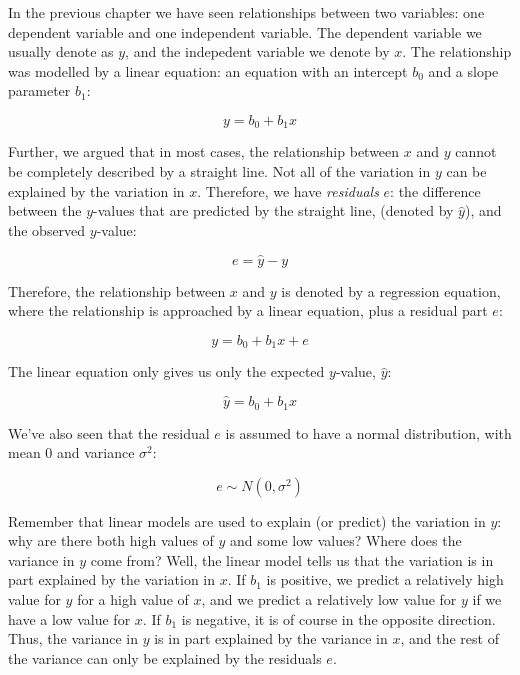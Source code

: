 \documentclass[]{book}\usepackage[]{graphicx}\usepackage[]{color}
\begin{document}
In the previous chapter we have seen relationships between two variables: one dependent variable and one independent variable. The dependent variable we usually denote as $y$, and the indepedent variable we denote by $x$. The relationship was modelled by a linear equation: an equation with an intercept $b_0$ and a slope parameter $b_1$:


\begin{equation}
y = b_0 + b_1 x
\end{equation}

Further, we argued that in most cases, the relationship between $x$ and $y$ cannot be completely described by a straight line. Not all of the variation in $y$ can be explained by the variation in $x$. Therefore, we have \textit{residuals} $e$: the difference between the $y$-values that are predicted by the straight line, (denoted by $\hat{y}$), and the observed $y$-value:

\begin{equation}
e = \hat{y} - y
\end{equation}

Therefore, the relationship between $x$ and $y$ is denoted by a regression equation, where the relationship is approached by a linear equation, plus a residual part $e$:

\begin{equation}
y = b_0 + b_1 x + e
\end{equation}

The linear equation only gives us only the expected $y$-value, $\hat{y}$:


\begin{equation}
\hat{y} = b_0 + b_1 x
\end{equation}


We've also seen that the residual $e$ is assumed to have a normal distribution, with mean 0 and variance $\sigma^2$:


\begin{equation}
e \sim N(0,\sigma^2)
\end{equation}

Remember that linear models are used to explain (or predict) the variation in $y$: why are there both high values of $y$ and some low values? Where does the variance in $y$ come from? Well, the linear model tells us that the variation is in part explained by the variation in $x$. If $b_1$ is positive, we predict a relatively high value for $y$ for a high value of $x$, and we predict a relatively low value for $y$ if we have a low value for $x$. If $b_1$ is negative, it is of course in the opposite direction. Thus, the variance in $y$ is in part explained by the variance in $x$, and the rest of the variance can only be explained by the residuals $e$.
\end{document}
